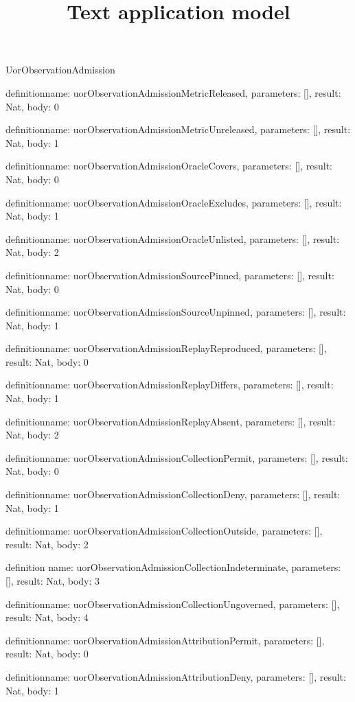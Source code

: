 \begin{lexlean}{UorObservationAdmission}
\title{Text application model}
\begin{semanticmodule}
definition{name: uorObservationAdmissionMetricReleased, parameters: [], result: Nat, body: 0}

definition{name: uorObservationAdmissionMetricUnreleased, parameters: [], result: Nat, body: 1}

definition{name: uorObservationAdmissionOracleCovers, parameters: [], result: Nat, body: 0}

definition{name: uorObservationAdmissionOracleExcludes, parameters: [], result: Nat, body: 1}

definition{name: uorObservationAdmissionOracleUnlisted, parameters: [], result: Nat, body: 2}

definition{name: uorObservationAdmissionSourcePinned, parameters: [], result: Nat, body: 0}

definition{name: uorObservationAdmissionSourceUnpinned, parameters: [], result: Nat, body: 1}

definition{name: uorObservationAdmissionReplayReproduced, parameters: [], result: Nat, body: 0}

definition{name: uorObservationAdmissionReplayDiffers, parameters: [], result: Nat, body: 1}

definition{name: uorObservationAdmissionReplayAbsent, parameters: [], result: Nat, body: 2}

definition{name: uorObservationAdmissionCollectionPermit, parameters: [], result: Nat, body: 0}

definition{name: uorObservationAdmissionCollectionDeny, parameters: [], result: Nat, body: 1}

definition{name: uorObservationAdmissionCollectionOutside, parameters: [], result: Nat, body: 2}

definition{
  name: uorObservationAdmissionCollectionIndeterminate,
  parameters: [],
  result: Nat,
  body: 3
}

definition{name: uorObservationAdmissionCollectionUngoverned, parameters: [], result: Nat, body: 4}

definition{name: uorObservationAdmissionAttributionPermit, parameters: [], result: Nat, body: 0}

definition{name: uorObservationAdmissionAttributionDeny, parameters: [], result: Nat, body: 1}


\end{semanticmodule}
\end{lexlean}
